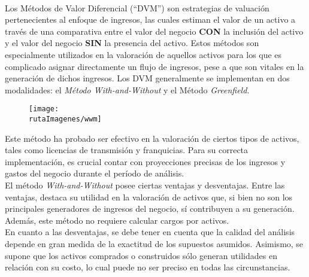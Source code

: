 \\

Los \textcolor{principal}{Métodos de Valor Diferencial (``DVM'')} son estrategias de valuación pertenecientes al enfoque de ingresos, las cuales estiman el valor de un activo a través de una comparativa entre el valor del negocio \textbf{CON} la inclusión del activo y el valor del negocio \textbf{SIN} la presencia del activo. Estos métodos son especialmente utilizados en la valoración de aquellos activos para los que es complicado asignar directamente un flujo de ingresos, pese a que son vitales en la generación de dichos ingresos. Los \textcolor{principal}{DVM} generalmente se implementan en dos modalidades: \textcolor{principal}{el \textit{Método With-and-Without} y el Método \textit{Greenfield.}}\\

%

\begin{figure}[H]
\centering
\texttt{[image: \\rutaImagenes/wwm]}
\end{figure}


Este método ha probado ser efectivo en la valoración de ciertos tipos de activos, tales como \textcolor{principal}{licencias de transmisión y franquicias}. Para su correcta implementación, es crucial contar con proyecciones precisas de los ingresos y gastos del negocio durante el período de análisis.\\

El método \textit{With-and-Without} posee ciertas ventajas y desventajas. Entre las ventajas, destaca su utilidad en la valoración de activos que, si bien no son los principales generadores de ingresos del negocio, sí contribuyen a su generación. Además, este método no requiere calcular cargos por activos.\\

En cuanto a las desventajas, se debe tener en cuenta que la calidad del análisis depende en gran medida de la exactitud de los supuestos asumidos. Asimismo, se supone que los activos comprados o construidos sólo generan utilidades en relación con su costo, lo cual puede no ser preciso en todas las circunstancias.\\

